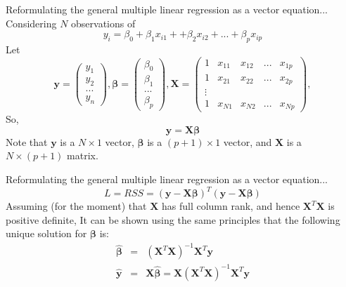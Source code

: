 \documentclass[aspectratio=169]{beamer}
\let \vec \mathbf
\begin{document}
    \begin{frame}{Reformulating the general multiple linear regression as a vector equation...}
    Considering $N$ observations of
    \begin{equation*}
        y_i = \beta_0 + \beta_1 x_{i1} + + \beta_2 x_{i2} + ... + \beta_p x_{ip}
    \end{equation*}
    Let
    \begin{equation*}
        \vec{y} = \begin{pmatrix}y_1\\y_2\\...\\y_n\end{pmatrix}, \bm{\beta} = \begin{pmatrix}\beta_0\\\beta_1\\...\\\beta_p\end{pmatrix}, \vec{X} = \begin{pmatrix}1 & x_{11} & x_{12} & ... & x_{1p}\\
        1 & x_{21} & x_{22} & ... & x_{2p}\\
        \vdots & & & & \\
        1 & x_{N1} & x_{N2} & ... & x_{Np}\end{pmatrix},
    \end{equation*}
    So,
    \begin{equation*}
        \vec{y} = \vec{X}\bm{\beta}
    \end{equation*}
    Note that $\vec{y}$ is a $N \times 1$ vector,
    $\bm{\beta}$ is a $(p+1) \times 1$ vector, and $\vec{X}$ is a  $N \times (p+1)$ matrix.
\end{frame}


\begin{frame}{Reformulating the general multiple linear regression as a vector equation...}
    \begin{equation*}
        L = RSS = (\vec{y} - \vec{X}\bm{\beta})^T(\vec{y} - \vec{X}\bm{\beta})
    \end{equation*}
    Assuming (for the moment) that $\vec{X}$ has full column rank, and hence $\vec{X}^T\vec{X}$ is positive definite, It can be shown using the same principles that the following unique solution for $\bm{\beta}$ is:
    \begin{eqnarray*}
        \hat{\bm{\beta}} &=& (\vec{X}^T \vec{X})^{-1} \vec{X}^T \vec{y} \\
        \hat{\vec{y}} & = & \vec{X} \hat{\bm{\beta}} = \vec{X}(\vec{X}^T \vec{X})^{-1} \vec{X}^T \vec{y}
    \end{eqnarray*}
\end{frame}
\end{document}
